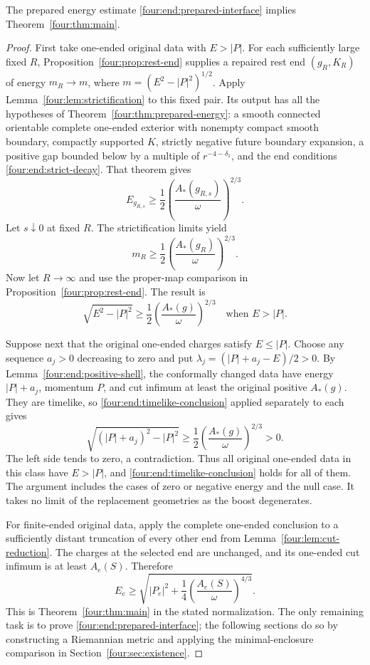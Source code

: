 \begin{proposition}\label{four:end:transfer}
The prepared energy estimate \eqref{four:end:prepared-interface} implies
Theorem~\ref{four:thm:main}.
\end{proposition}

\begin{proof}
First take one-ended original data with \(E>|P|\). For each sufficiently
large fixed \(R\), Proposition~\ref{four:prop:rest-end} supplies a repaired
rest end \((g_R,K_R)\) of energy \(m_R\to m\), where
\(m=(E^2-|P|^2)^{1/2}\). Apply Lemma~\ref{four:lem:strictification} to this
fixed pair. Its output has all the hypotheses of
Theorem~\ref{four:thm:prepared-energy}: a smooth connected orientable complete
one-ended exterior with nonempty compact smooth boundary, compactly
supported \(K\), strictly negative future boundary expansion, a positive
gap bounded below by a multiple of \(r^{-4-\delta_1}\), and the end
conditions \eqref{four:end:strict-decay}. That theorem gives
\[
 E_{g_{R,s}}\ge\frac12
       \left(\frac{A_*(g_{R,s})}{\omega}\right)^{2/3}.
\]
Let \(s\downarrow0\) at fixed \(R\). The strictification limits yield
\[
 m_R\ge\frac12\left(\frac{A_*(g_R)}{\omega}\right)^{2/3}.
\]
Now let \(R\to\infty\) and use the proper-map comparison in
Proposition~\ref{four:prop:rest-end}. The result is
\begin{equation}\label{four:end:timelike-conclusion}
 \sqrt{E^2-|P|^2}\ge
       \frac12\left(\frac{A_*(g)}{\omega}\right)^{2/3}
       \quad\text{when }E>|P|.
\end{equation}

Suppose next that the original one-ended charges satisfy \(E\le|P|\).
Choose any sequence \(a_j>0\) decreasing to zero and put
\(\lambda_j=(|P|+a_j-E)/2>0\). By
Lemma~\ref{four:end:positive-shell}, the conformally changed data have
energy \(|P|+a_j\), momentum \(P\), and cut infimum at least the
original positive \(A_*(g)\). They are timelike, so
\eqref{four:end:timelike-conclusion} applied separately to each gives
\[
 \sqrt{(|P|+a_j)^2-|P|^2}
       \ge\frac12\left(\frac{A_*(g)}{\omega}\right)^{2/3}>0.
\]
The left side tends to zero, a contradiction. Thus all original
one-ended data in this class have \(E>|P|\), and
\eqref{four:end:timelike-conclusion} holds for all of them. The argument
includes the cases of zero or negative energy and the null case.
It takes no limit of the replacement geometries as the boost degenerates.

For finite-ended original data, apply the complete one-ended conclusion
to a sufficiently distant truncation of every other end from
Lemma~\ref{four:lem:cut-reduction}. The charges at the selected end are
unchanged, and its one-ended cut infimum is at least \(A_e(S)\).
Therefore
\[
 E_e\ge\sqrt{|P_e|^2+
                 \frac14\left(\frac{A_e(S)}{\omega}\right)^{4/3}}.
\]
This is Theorem~\ref{four:thm:main} in the stated normalization. The only
remaining task is to prove \eqref{four:end:prepared-interface}; the following
sections do so by constructing a Riemannian metric and applying the
minimal-enclosure comparison in Section~\ref{four:sec:existence}.
\end{proof}
